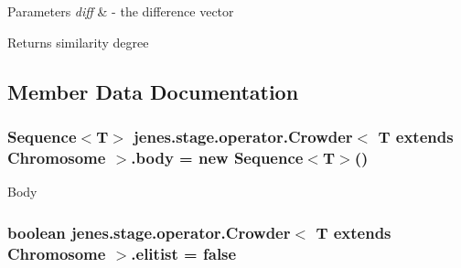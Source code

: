 \begin{DoxyParams}{Parameters}
{\em diff} & -\/ the difference vector \\
\hline
\end{DoxyParams}
\begin{DoxyReturn}{Returns}
similarity degree 
\end{DoxyReturn}


\subsection{Member Data Documentation}
\hypertarget{classjenes_1_1stage_1_1operator_1_1_crowder_3_01_t_01extends_01_chromosome_01_4_a81522e76967039395a3567c866fa59ed}{
\subsubsection[{body}]{\setlength{\rightskip}{0pt plus 5cm}Sequence$<$T$>$ jenes.\-stage.\-operator.\-Crowder$<$ T extends Chromosome $>$.body = new Sequence$<$T$>$()\hspace{0.3cm}{\ttfamily [protected]}}}\label{classjenes_1_1stage_1_1operator_1_1_crowder_3_01_t_01extends_01_chromosome_01_4_a81522e76967039395a3567c866fa59ed}
Body \hypertarget{classjenes_1_1stage_1_1operator_1_1_crowder_3_01_t_01extends_01_chromosome_01_4_a5337bdf3f7d5ad8d6e09daaa3bb0636b}{
\subsubsection[{elitist}]{\setlength{\rightskip}{0pt plus 5cm}boolean jenes.\-stage.\-operator.\-Crowder$<$ T extends Chromosome $>$.elitist = false\hspace{0.3cm}{\ttfamily [protected]}}}\label{classjenes_1_1stage_1_1operator_1_1_crowder_3_01_t_01extends_01_chromosome_01_4_a5337bdf3f7d5ad8d6e09daaa3bb0636b}
